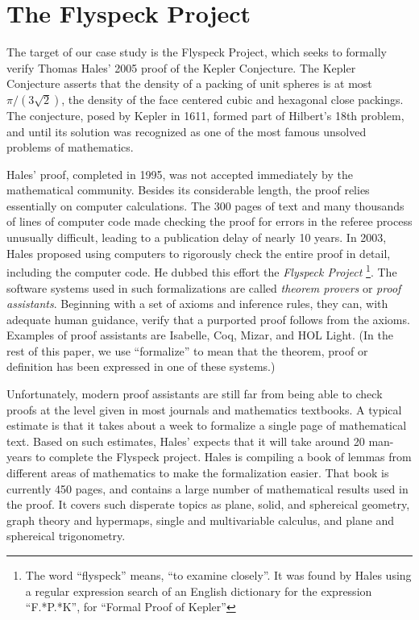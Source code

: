 
\section{The Flyspeck Project}
\label{sec:flyspeck}

The target of our case study is the Flyspeck Project, which seeks to
formally verify Thomas Hales' 2005 proof of the Kepler Conjecture.
The Kepler Conjecture asserts that the density of a packing of unit
spheres is at most $\pi/(3\sqrt{2})$, the density of the face centered
cubic and hexagonal close packings.  The conjecture, posed by Kepler
in 1611, formed part of Hilbert's 18th problem, and until its solution
was recognized as one of the most famous unsolved problems of
mathematics.%

Hales' proof, completed in 1995, was not accepted immediately by the mathematical community. 
Besides its considerable length,  the proof relies essentially on computer calculations.  
The 300 pages of text and many thousands of lines of computer code made
checking the proof for errors in the referee process unusually difficult,
leading to a publication delay of nearly 10 years.  
In 2003, Hales proposed using computers to rigorously check the entire proof in
detail, including the computer code.  He dubbed this
effort the \textit{Flyspeck Project}
\footnote{The word ``flyspeck'' means, ``to examine closely''.  It was found
by Hales using a regular expression search of an English dictionary for the
expression ``F.*P.*K'', for ``Formal Proof of Kepler''}.  
The software systems used in such formalizations are called \textit{theorem provers}
or \textit{proof assistants}.
Beginning with a set of axioms and inference rules, they can,
with adequate human guidance, verify that a purported proof follows from the axioms.  
Examples of proof assistants are Isabelle\cite{Paulson:1994:Isabelle}, 
Coq\cite{Bertot:2004:CoqBook}, Mizar\cite{mizarmanual},
and HOL Light\cite{Harrison:2000:HOL-Light}. (In the rest of this paper, we use ``formalize'' to mean
that the theorem, proof or definition has been expressed in one of these
systems.)

  Unfortunately, modern proof assistants are still far from being able to check
proofs at the level given in most journals and mathematics textbooks.  A typical
estimate is that it takes about a week to formalize a single page of mathematical
text.  Based on such estimates, Hales' expects that it will take 
around 20 man-years to complete the Flyspeck project.  
Hales is compiling a book\cite{Hales:2007:FlyspeckBook}
of lemmas from different areas of mathematics to make the formalization easier.    
That book is currently 450 pages, and contains a large number of mathematical
results used in the proof.  It covers such disperate topics
as plane, solid, and sphereical geometry, graph theory and hypermaps, single and
multivariable calculus, and plane and sphereical trigonometry.

